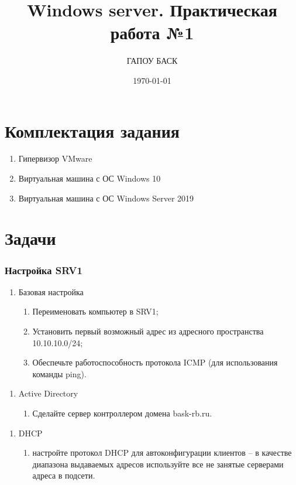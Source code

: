 \documentclass[a4paper, 12pt]{report}
\author{ГАПОУ БАСК}
\title{Windows server. Практическая работа №1}
\date{\today}
\begin{document}
	
	\maketitle
	\clearpage

	\section{Комплектация задания}

	\begin{enumerate}
		\item Гипервизор VMware
		\item Виртуальная машина с ОС Windows 10
		\item Виртуальная машина с ОС Windows Server 2019
	\end{enumerate}

	\section{Задачи}
	
	\subsubsection{Настройка SRV1}
	
	\begin{enumerate}
		\item Базовая настройка
		\begin{enumerate}
			\item Переименовать компьютер в SRV1;
			\item Установить первый возможный адрес из адресного пространства 10.10.10.0/24;
			\item Обеспечьте работоспособность протокола ICMP (для использования команды ping).
		\end{enumerate}
	\end{enumerate}

	\begin{enumerate}
		\item Active Directory
		\begin{enumerate}
			\item Сделайте сервер контроллером домена bask-rb.ru.
		\end{enumerate}
	\end{enumerate}

	\begin{enumerate}
		\item DHCP
		\begin{enumerate}
			\item настройте протокол DHCP для автоконфигурации клиентов – в качестве диапазона выдаваемых адресов используйте все не занятые серверами адреса в подсети.
		\end{enumerate}
	\end{enumerate}
\end{document}
